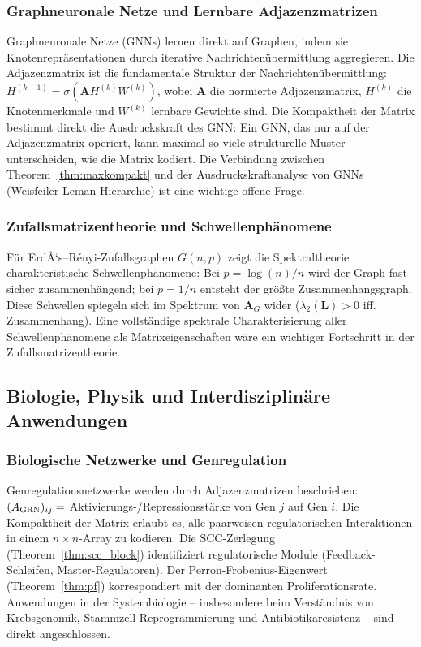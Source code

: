 ﻿\documentclass[12pt, a4paper]{article}
\theoremstyle{definition}
\theoremstyle{remark}
\newcommand{\vA}{\bm{A}}
\newcommand{\vL}{\bm{L}}
\begin{document}
\subsubsection*{Graphneuronale Netze und Lernbare Adjazenzmatrizen}

Graphneuronale Netze (GNNs) lernen direkt auf Graphen, indem sie
Knotenrepräsentationen durch iterative Nachrichtenübermittlung
aggregieren. Die Adjazenzmatrix ist die fundamentale Struktur der
Nachrichtenübermittlung: $H^{(k+1)} = \sigma(\tilde{\vA} H^{(k)} W^{(k)})$,
wobei $\tilde{\vA}$ die normierte Adjazenzmatrix, $H^{(k)}$ die
Knotenmerkmale und $W^{(k)}$ lernbare Gewichte sind. Die Kompaktheit
der Matrix bestimmt direkt die Ausdruckskraft des GNN: Ein GNN, das nur
auf der Adjazenzmatrix operiert, kann maximal so viele strukturelle
Muster unterscheiden, wie die Matrix kodiert. Die Verbindung zwischen
Theorem~\ref{thm:maxkompakt} und der Ausdruckskraftanalyse von GNNs
(Weisfeiler-Leman-Hierarchie) ist eine wichtige offene Frage.

\subsubsection*{Zufallsmatrizentheorie und Schwellenphänomene}

Für ErdÅ‘s--Rényi-Zufallsgraphen $G(n,p)$ zeigt die Spektraltheorie
charakteristische Schwellenphänomene: Bei $p = \log(n)/n$ wird der
Graph fast sicher zusammenhängend; bei $p = 1/n$ entsteht der größte
Zusammenhangsgraph. Diese Schwellen spiegeln sich im Spektrum von
$\vA_G$ wider ($\lambda_2(\vL) > 0$ iff. Zusammenhang). Eine
vollständige spektrale Charakterisierung aller Schwellenphänomene
als Matrixeigenschaften wäre ein wichtiger Fortschritt in der
Zufallsmatrizentheorie.

\subsection{Biologie, Physik und Interdisziplinäre Anwendungen}
\label{subsec:interdisziplin}

\subsubsection*{Biologische Netzwerke und Genregulation}

Genregulationsnetzwerke werden durch Adjazenzmatrizen beschrieben:
$(A_{\rm GRN})_{ij} = $ Akti\-vierungs-/Repressionsstärke von Gen $j$ auf
Gen $i$. Die Kompaktheit der Matrix erlaubt es, alle paarweisen
regulatorischen Interaktionen in einem $n \times n$-Array zu kodieren.
Die SCC-Zerlegung (Theorem~\ref{thm:scc_block}) identifiziert regulatorische
Module (Feedback-Schleifen, Master-Regulatoren). Der Perron-Frobenius-Eigenwert
(Theorem~\ref{thm:pf}) korrespondiert mit der dominanten
Proliferationsrate. Anwendungen in der Systembiologie -- insbesondere
beim Verständnis von Krebsgenomik, Stammzell-Reprogrammierung und
Antibiotikaresistenz -- sind direkt angeschlossen.
\end{document}
